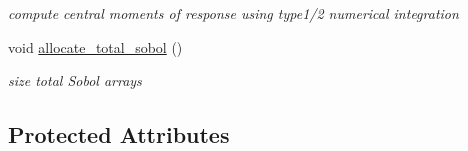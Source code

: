 \begin{DoxyCompactItemize}
\begin{DoxyCompactList}\small\item\em compute central moments of response using type1/2 numerical integration \end{DoxyCompactList}\item 
void \hyperlink{classPecos_1_1PolynomialApproximation_a5510657b27410ccddc71d02964b94732}{allocate\+\_\+total\+\_\+sobol} ()\label{classPecos_1_1PolynomialApproximation_a5510657b27410ccddc71d02964b94732}

\begin{DoxyCompactList}\small\item\em size total Sobol arrays \end{DoxyCompactList}\end{DoxyCompactItemize}
\subsection*{Protected Attributes}
